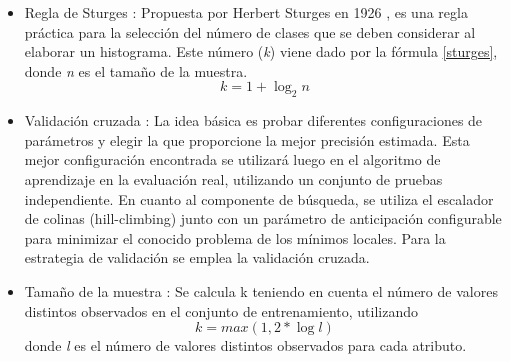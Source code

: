 \begin{itemize}

	\item Regla de Sturges \citep{coria2013mineria}: Propuesta por Herbert Sturges en 1926 \citep{sturges1926choice}, es una regla práctica para la selección del número de clases que se deben considerar al elaborar un histograma. Este número (\textit{k}) viene dado por la fórmula \ref{sturges}, donde \textit{n} es el tamaño de la muestra.
	\begin{equation} \label{sturges}
		k = 1 + \log_{2} n
	\end{equation}

	\item Validación cruzada \citep{torgo1997search}: La idea básica es probar diferentes configuraciones de parámetros y elegir la que proporcione la mejor precisión estimada. Esta mejor configuración encontrada se utilizará luego en el algoritmo de aprendizaje en la evaluación real, utilizando un conjunto de pruebas independiente. En cuanto al componente de búsqueda, se utiliza el escalador de colinas (hill-climbing) junto con un parámetro de anticipación configurable para minimizar el conocido problema de los mínimos locales. Para la estrategia de validación se emplea la validación cruzada.

	\item Tamaño de la muestra \citep{dougherty1995supervised}: Se calcula k teniendo en cuenta el número de valores distintos observados en el conjunto de entrenamiento, utilizando
	\begin{equation}
		k = max(1, 2 * \log l )
	\end{equation}
	 donde \textit{l} es el número de valores distintos observados para cada atributo.

\end{itemize}

